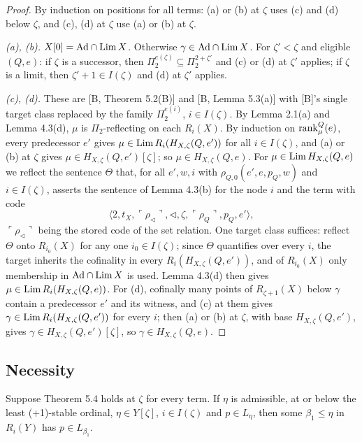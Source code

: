 \documentclass[11pt]{article}
\begin{document}
\begin{proof}
By induction on positions for all terms: (a) or (b) at $\zeta$ uses (c) and (d) below $\zeta$, and (c), (d) at $\zeta$
use (a) or (b) at $\zeta$.

\emph{(a), (b).} $X[0] = \mathrm{Ad} \cap \mathrm{Lim}\, X$. Otherwise $\gamma \in \mathrm{Ad} \cap \mathrm{Lim}\, X$. For $\zeta' < \zeta$ and eligible
$(Q,e)$: if $\zeta$ is a successor, then $\Pi_2^{e(\zeta)} \subseteq \Pi_2^{2+\zeta'}$ and (c) or (d) at $\zeta'$ applies; if $\zeta$
is a limit, then $\zeta'+1 \in I(\zeta)$ and (d) at $\zeta'$ applies.

\emph{(c), (d).} These are [B, Theorem 5.2(B)] and [B, Lemma 5.3(a)] with [B]'s single target class replaced by the
family $\Pi_2^{e(i)}$, $i \in I(\zeta)$. By Lemma 2.1(a) and Lemma 4.3(d), $\mu$ is $\Pi_2$-reflecting on each $R_i(X)$. By
induction on $\mathrm{rank}^Q_\mu(e)$, every predecessor $e'$ gives $\mu \in \mathrm{Lim}\, R_i(H_{X,\zeta}(Q,e'))$ for all $i \in
I(\zeta)$, and (a) or (b) at $\zeta$ gives $\mu \in H_{X,\zeta}(Q,e')[\zeta]$; so $\mu \in H_{X,\zeta}(Q,e)$. For $\mu
\in \mathrm{Lim}\, H_{X,\zeta}(Q,e)$ we reflect the sentence $\Theta$ that, for all $e', w, i$ with $\rho_{Q,0}(e',e,p_Q,w)$ and
$i \in I(\zeta)$, asserts the sentence of Lemma 4.3(b) for the node $i$ and the term with code
\[ \langle 2, t_X, \ulcorner\rho_\lhd\urcorner, \lhd, \zeta, \ulcorner\rho_Q\urcorner, p_Q, e'\rangle, \]
$\ulcorner\rho_\lhd\urcorner$ being the stored code of the set relation. One target class suffices: reflect $\Theta$ onto
$R_{i_0}(X)$ for any one $i_0 \in I(\zeta)$; since $\Theta$ quantifies over every $i$, the target inherits the
cofinality in every $R_i(H_{X,\zeta}(Q,e'))$, and of $R_{i_0}(X)$ only membership in $\mathrm{Ad} \cap \mathrm{Lim}\, X$ is used. Lemma
4.3(d) then gives $\mu \in \mathrm{Lim}\, R_i(H_{X,\zeta}(Q,e))$. For (d), cofinally many points of $R_{\zeta+1}(X)$ below
$\gamma$ contain a predecessor $e'$ and its witness, and (c) at them gives $\gamma \in \mathrm{Lim}\, R_i(H_{X,\zeta}(Q,e'))$ for
every $i$; then (a) or (b) at $\zeta$, with base $H_{X,\zeta}(Q,e')$, gives $\gamma \in H_{X,\zeta}(Q,e')[\zeta]$, so
$\gamma \in H_{X,\zeta}(Q,e)$.
\end{proof}

\subsection{Necessity}

\begin{statement} Suppose Theorem 5.4 holds at $\zeta$ for every term. If $\eta$ is
admissible, at or below the least (+1)-stable ordinal, $\eta \in Y[\zeta]$, $i \in I(\zeta)$ and $p \in L_\eta$, then some $\beta_1 \le \eta$ in $R_i(Y)$ has
$p \in L_{\beta_1}$.
\end{statement}
\end{document}
